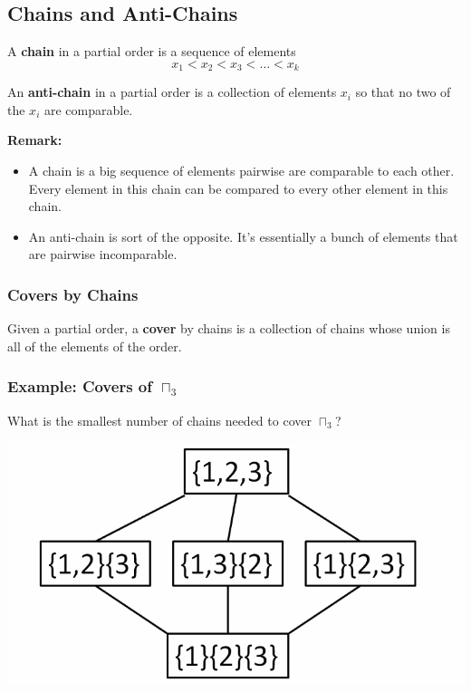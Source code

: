 \documentclass[letterpaper]{article}
\begin{document}
\subsection{Chains and Anti-Chains}
\begin{definition}{}{}
    A \textbf{chain} in a partial order is a sequence of elements
    \[x_1 < x_2 < x_3 < \dots < x_k\]
\end{definition}

\begin{definition}{}{}
    An \textbf{anti-chain} in a partial order is a collection of elements $x_i$ so that no two of the $x_i$ are comparable. 
\end{definition}

\textbf{Remark:}
\begin{itemize}
    \item A chain is a big sequence of elements pairwise are comparable to each other. Every element in this chain can be compared to every other element in this chain. 
    \item An anti-chain is sort of the opposite. It's essentially a bunch of elements that are pairwise incomparable. 
\end{itemize}

\subsubsection{Covers by Chains}
\begin{definition}{}{}
    Given a partial order, a \textbf{cover} by chains is a collection of chains whose union is all of the elements of the order. 
\end{definition}

\subsubsection{Example: Covers of \texorpdfstring{$\sqcap_3$}{Set of Set Partitions of [3] Ordered by Refinement}}
What is the smallest number of chains needed to cover $\sqcap_3$?
\begin{center}
    \includegraphics[scale=0.3]{img/ex_hasse.PNG}
\end{center}
\end{document}
